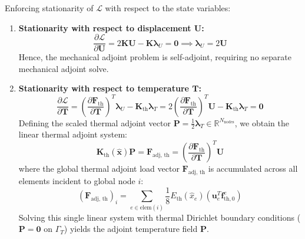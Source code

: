 \documentclass[11pt, a4paper]{article}
\begin{document}
Enforcing stationarity of $\mathcal{L}$ with respect to the state variables:
\begin{enumerate}
    \item \textbf{Stationarity with respect to displacement $\mathbf{U}$:}
    \begin{equation}
    \frac{\partial \mathcal{L}}{\partial \mathbf{U}} = 2 \mathbf{K} \mathbf{U} - \mathbf{K} \boldsymbol{\lambda}_U = \mathbf{0} \implies \boldsymbol{\lambda}_U = 2 \mathbf{U}
    \end{equation}
    Hence, the mechanical adjoint problem is self-adjoint, requiring no separate mechanical adjoint solve.
    \item \textbf{Stationarity with respect to temperature $\mathbf{T}$:}
    \begin{equation}
    \frac{\partial \mathcal{L}}{\partial \mathbf{T}} = \left( \frac{\partial \mathbf{F}_{\text{th}}}{\partial \mathbf{T}} \right)^T \boldsymbol{\lambda}_U - \mathbf{K}_{\text{th}} \boldsymbol{\lambda}_T = 2 \left( \frac{\partial \mathbf{F}_{\text{th}}}{\partial \mathbf{T}} \right)^T \mathbf{U} - \mathbf{K}_{\text{th}} \boldsymbol{\lambda}_T = \mathbf{0}
    \end{equation}
    Defining the scaled thermal adjoint vector $\mathbf{P} = \frac{1}{2} \boldsymbol{\lambda}_T \in \mathbb{R}^{N_{\text{nodes}}}$, we obtain the linear thermal adjoint system:
    \begin{equation}
    \mathbf{K}_{\text{th}}(\hat{\mathbf{x}}) \mathbf{P} = \mathbf{F}_{\text{adj, th}} = \left( \frac{\partial \mathbf{F}_{\text{th}}}{\partial \mathbf{T}} \right)^T \mathbf{U}
    \end{equation}
    where the global thermal adjoint load vector $\mathbf{F}_{\text{adj, th}}$ is accumulated across all elements incident to global node $i$:
    \begin{equation}
    (\mathbf{F}_{\text{adj, th}})_i = \sum_{e \in \text{elem}(i)} \frac{1}{8} E_{\text{th}}(\hat{x}_e) \left( \mathbf{u}_e^T \mathbf{f}_{\text{th}, 0}^e \right)
    \end{equation}
    Solving this single linear system with thermal Dirichlet boundary conditions ($\mathbf{P} = \mathbf{0}$ on $\Gamma_T$) yields the adjoint temperature field $\mathbf{P}$.
\end{enumerate}
\end{document}

